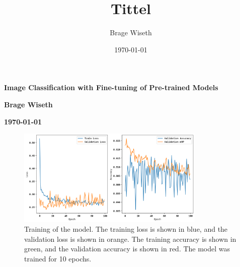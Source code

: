 \documentclass{article}[9pt]
\title{Tittel}%
\author{Brage Wiseth}%
\date{\today}%
\begin{document}
%
    \begin{center}
        \textbf{\LARGE Image Classification with Fine-tuning of Pre-trained Models}
    \end{center}
    \vspace{0.5em}
    \begin{center}
        \textbf{Brage Wiseth}
    \end{center}
    \begin{center}
        \textbf{\today}
    \end{center}
    \vspace{0.5em}



\begin{figure}[!ht]
    \centering
    \includegraphics[width=0.8\textwidth]{training.png}
    \caption{Training of the model. The training loss is shown in blue, and the validation loss is shown in orange. The training accuracy is shown in green, and the validation accuracy is shown in red. The model was trained for 10 epochs.}
    \label{fig:training}
\end{figure}
\end{document}
